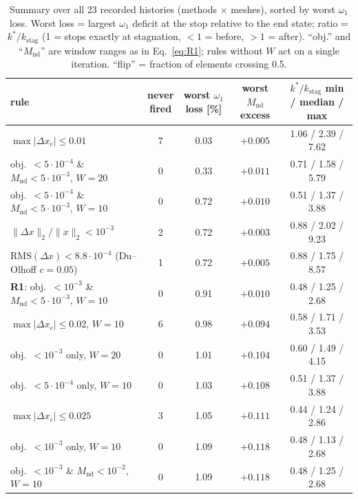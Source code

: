 \documentclass[11pt,a4paper]{article}
\newcommand{\Mnd}{M_{\mathrm{nd}}}
\newcommand{\kstag}{k_{\mathrm{stag}}}
\newcommand{\dx}{\Delta x}
\newcommand{\maxdx}{\max|\Delta x_e|}
\newcommand{\relL}{\|\Delta x\|_2/\|x\|_2}
\newcommand{\RMS}{\mathrm{RMS}}
\begin{document}
\begin{table}[htbp]
\centering\small
\caption{Summary over all 23 recorded histories (methods $\times$ meshes),
  sorted by worst $\omega_1$ loss. Worst loss = largest $\omega_1$ deficit at the
  stop relative to the end state; ratio = $k^*/\kstag$ (1 = stops exactly at
  stagnation, $<1$ = before, $>1$ = after). ``obj.'' and ``$\Mnd$'' are window
  ranges as in Eq.~\eqref{eq:R1}; rules without $W$ act on a single iteration.
  ``flip'' = fraction of elements crossing 0.5.}
\label{tab:D}
\begin{tabular}{@{}lcccc@{}}
\toprule
rule & \makecell{never\\fired} & \makecell{worst $\omega_1$\\loss [\%]}
  & \makecell{worst $\Mnd$\\excess} & \makecell{$k^*/\kstag$\\min / median / max} \\
\midrule
$\maxdx \le 0.01$                                       & 7 & 0.03 & $+0.005$ & 1.06 / 2.39 / 7.62 \\
obj.\ $<5\cdot10^{-4}$ \& $\Mnd<5\cdot10^{-3}$, $W{=}20$ & 0 & 0.33 & $+0.011$ & 0.71 / 1.58 / 5.79 \\
obj.\ $<5\cdot10^{-4}$ \& $\Mnd<5\cdot10^{-3}$, $W{=}10$ & 0 & 0.72 & $+0.010$ & 0.51 / 1.37 / 3.88 \\
$\relL < 10^{-3}$                                       & 2 & 0.72 & $+0.003$ & 0.88 / 2.02 / 9.23 \\
$\RMS(\dx) < 8.8\cdot10^{-4}$ (Du--Olhoff $c{=}0.05$)    & 1 & 0.72 & $+0.005$ & 0.88 / 1.75 / 8.57 \\
\textbf{R1}: obj.\ $<10^{-3}$ \& $\Mnd<5\cdot10^{-3}$, $W{=}10$ & 0 & 0.91 & $+0.010$ & 0.48 / 1.25 / 2.68 \\
$\maxdx \le 0.02$, $W{=}10$                              & 6 & 0.98 & $+0.094$ & 0.58 / 1.71 / 3.53 \\
obj.\ $<10^{-3}$ only, $W{=}20$                          & 0 & 1.01 & $+0.104$ & 0.60 / 1.49 / 4.15 \\
obj.\ $<5\cdot10^{-4}$ only, $W{=}10$                    & 0 & 1.03 & $+0.108$ & 0.51 / 1.37 / 3.88 \\
$\maxdx \le 0.025$                                      & 3 & 1.05 & $+0.111$ & 0.44 / 1.24 / 2.86 \\
obj.\ $<10^{-3}$ only, $W{=}10$                          & 0 & 1.09 & $+0.118$ & 0.48 / 1.13 / 2.68 \\
obj.\ $<10^{-3}$ \& $\Mnd<10^{-2}$, $W{=}10$             & 0 & 1.09 & $+0.118$ & 0.48 / 1.25 / 2.68 \\

\end{tabular}
\end{table}
\end{document}
